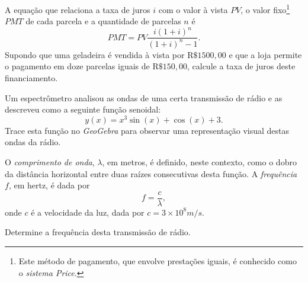 \begin{question}
A equação que relaciona a taxa de juros $i$ com o valor à vista $PV$, o valor fixo\footnote{Este método de pagamento, que envolve prestações iguais, é conhecido como o \emph{sistema Price}.} $PMT$ de cada parcela e a quantidade de parcelas $n$ é
$$PMT=PV\frac{i(1+i)^n}{(1+i)^n-1}.$$
Supondo que uma geladeira é vendida à vista por R$\$1500,00$ e que a loja permite o pagamento em doze parcelas iguais de R$\$150,00$, calcule a taxa de juros deste financiamento. 
\end{question}

\begin{question}
Um espectrômetro analisou as ondas de uma certa transmissão de rádio e as descreveu como a seguinte função senoidal:
$$y(x)=x^3\sin(x)+\cos(x)+3.$$
Trace esta função no \emph{GeoGebra} para observar uma representação visual destas ondas da rádio. 


O \emph{comprimento de onda}, $\lambda$, em metros, é definido, neste contexto, como o dobro da distância horizontal entre duas raízes consecutivas desta função. A \emph{frequência} $f$, em hertz, é dada por
$$f=\frac{c}{\lambda},$$
onde $c$ é a velocidade da luz, dada por $c=3\times 10^8 m/s$.


Determine a frequência desta transmissão de rádio.
\end{question}
